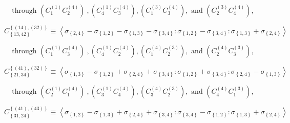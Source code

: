 \documentclass[11pt]{article}
\begin{document}
\begin{equation*}
\text{through }\left( C_{1}^{\left( 1\right) }C_{2}^{\left( 4\right)
}\right) \ ,\left( C_{4}^{\left( 1\right) }C_{3}^{\left( 4\right) }\right)
,\left( C_{1}^{\left( 3\right) }C_{3}^{\left( 4\right) }\right) ,\text{ and }%
\left( C_{2}^{\left( 3\right) }C_{4}^{\left( 4\right) }\right) ,
\end{equation*}

\begin{equation*}
C_{\left\{ 13,42\right\} }^{\left\{ \left( 14\right) ,\left( 32\right)
\right\} }\equiv \left\langle \sigma _{\left\{ 2,4\right\} }-\sigma
_{\left\{ 1,2\right\} }-\sigma _{\left\{ 1,3\right\} }-\sigma _{\left\{
3,4\right\} }:\sigma _{\left\{ 1,2\right\} }-\sigma _{\left\{ 3,4\right\}
}:\sigma _{\left\{ 1,3\right\} }+\sigma _{\left\{ 2,4\right\} }\right\rangle 
\end{equation*}

\begin{equation*}
\text{through }\left( C_{1}^{\left( 1\right) }C_{3}^{\left( 4\right)
}\right) \ ,\left( C_{4}^{\left( 1\right) }C_{2}^{\left( 4\right) }\right)
,\left( C_{1}^{\left( 4\right) }C_{2}^{\left( 3\right) }\right) ,\text{ and }%
\left( C_{2}^{\left( 4\right) }C_{3}^{\left( 3\right) }\right) ,
\end{equation*}

\begin{equation*}
C_{\left\{ 21,34\right\} }^{\left\{ \left( 41\right) ,\left( 32\right)
\right\} }\equiv \left\langle \sigma _{\left\{ 1,3\right\} }-\sigma
_{\left\{ 1,2\right\} }+\sigma _{\left\{ 2,4\right\} }+\sigma _{\left\{
3,4\right\} }:\sigma _{\left\{ 1,2\right\} }+\sigma _{\left\{ 3,4\right\}
}:\sigma _{\left\{ 2,4\right\} }-\sigma _{\left\{ 1,3\right\} }\right\rangle 
\end{equation*}

\begin{equation*}
\text{through }\left( C_{2}^{\left( 1\right) }C_{1}^{\left( 4\right)
}\right) \ ,\left( C_{3}^{\left( 1\right) }C_{4}^{\left( 4\right) }\right)
,\left( C_{3}^{\left( 4\right) }C_{2}^{\left( 3\right) }\right) ,\text{ and }%
\left( C_{4}^{\left( 4\right) }C_{1}^{\left( 3\right) }\right) ,
\end{equation*}

\begin{equation*}
C_{\left\{ 31,24\right\} }^{\left\{ \left( 41\right) ,\left( 43\right)
\right\} }\equiv \left\langle \sigma _{\left\{ 1,2\right\} }-\sigma
_{\left\{ 1,3\right\} }+\sigma _{\left\{ 2,4\right\} }+\sigma _{\left\{
3,4\right\} }:\sigma _{\left\{ 3,4\right\} }-\sigma _{\left\{ 1,2\right\}
}:\sigma _{\left\{ 1,3\right\} }+\sigma _{\left\{ 2,4\right\} }\right\rangle 
\end{equation*}
\end{document}
